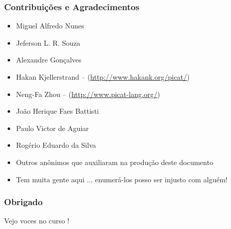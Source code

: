 \begin{frame}[fragile]
  \frametitle{Contribuições e Agradecimentos}

  \begin{itemize}
  \item Miguel Alfredo Nunes
  \item Jeferson L. R. Souza
    \item Alexandre Gonçalves 
    \item Hakan Kjellerstrand -- (\url{http://www.hakank.org/picat/})
    \item Neng-Fa Zhou -- (\url{http://www.picat-lang.org/})
    \item João Herique Faes Battisti
    \item Paulo Victor de Aguiar
    \item Rogério Eduardo da Silva
    \item Outros anônimos que auxiliaram na produção deste documento
    \item Tem muita gente aqui ... enumerá-los posso ser injusto com alguém!
  \end{itemize}

\end{frame}


\begin{frame}[fragile]
  \frametitle{Obrigado}

\begin{LARGE}
\begin{center}
Vejo voces no curso !
\end{center}
\end{LARGE}

\end{frame}
						

